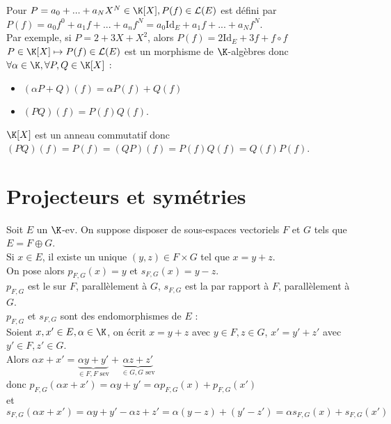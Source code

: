 \documentclass[12pt, a4paper]{report}
\begin{document}
\begin{exemple}[Exemples]{}
\begin{enumerate}
	Pour $P = a_0 + ... + a_NX^N \in \K[X], P(f) \in \mathcal{L}(E)$ est défini par $P(f) = a_0f^0 + a_1f + ... + a_nf^N = a_0 \text{Id}_E + a_1 f + ... + a_N f^N$. \\
	Par exemple, si $P = 2 + 3X + X^2$, alors $P(f) = 2\text{Id}_E + 3f + f\circ f$ \\
	
	$P \in \K[X] \mapsto P(f) \in \mathcal{L}(E)$ est un morphisme de $\K$-algèbres donc $\forall \alpha \in \K, \forall P,Q \in \K[X]$ :
	\begin{itemize}
		\item $(\alpha P + Q)(f) = \alpha P(f) + Q(f)$
		\item $(PQ)(f) = P(f)Q(f)$.
	\end{itemize}
	
	\begin{remarque}{}
	$\K[X]$ est un anneau commutatif donc $(PQ)(f) = P(f) = (QP)(f) = P(f) Q(f) = Q(f) P(f)$.
	\end{remarque}
\end{enumerate}
\end{exemple}

\newpage

\section{Projecteurs et symétries}

Soit $E$ un $\K$-ev. On suppose disposer de sous-espaces vectoriels $F$ et $G$ tels que $E = F \oplus G$.\\
Si $x \in E$, il existe un unique $(y,z) \in F \times G$ tel que $x = y+z$. \\

On pose alors $p_{F,G}(x) = y$ et $s_{F,G}(x)=y-z$. \\
$p_{F,G}$ est le  sur $F$, parallèlement à $G$, $s_{F,G}$ est la  par rapport à $F$, parallèlement à $G$. \\

$p_{F,G}$ et $s_{F,G}$ sont des endomorphismes de $E$ : \\
Soient $x,x' \in E, \alpha \in \K$, on écrit $x = y + z$ avec $y \in F, z \in G$, $x' = y' + z'$ avec $y' \in F, z' \in G$. \\
Alors $\alpha x + x' = \underbrace{\alpha y + y'}_{\in F, F \text{ sev}} + \underbrace{\alpha z + z'}_{\in G, G \text{ sev}}$ \\
donc $p_{F,G}(\alpha x + x') = \alpha y + y' = \alpha p_{F,G}(x) + p_{F,G}(x')$ \\
et $s_{F,G}(\alpha x + x') = \alpha y + y' - \alpha z + z' =\alpha (y-z) + (y'-z') = \alpha s_{F,G}(x) + s_{F,G}(x')$
\end{document}

